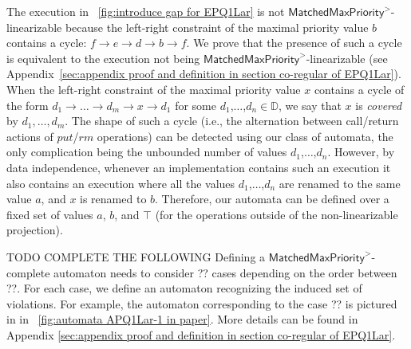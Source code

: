 The execution in \figurename~\ref{fig:introduce gap for EPQ1Lar} is not $\mathsf{MatchedMaxPriority}^>$-linearizable because the left-right constraint of the maximal priority value $b$ contains a cycle: $f \rightarrow e \rightarrow d \rightarrow b \rightarrow f$. We prove that the presence of such a cycle is equivalent to the execution not being $\mathsf{MatchedMaxPriority}^>$-linearizable (see Appendix~\ref{sec:appendix proof and definition in section co-regular of EPQ1Lar}).
When the left-right constraint of the maximal priority value $x$ contains a cycle of the form $d_1 \rightarrow \ldots \rightarrow d_m \rightarrow x \rightarrow d_1$ for some $d_1$,$\ldots$,$d_n\in \mathbb{D}$, we say that $x$ is \emph{covered} by $d_1,\ldots,d_m$. The shape of such a cycle (i.e., the alternation between call/return actions of $\textit{put}$/$\textit{rm}$ operations) can be detected using our class of automata, the only complication being the unbounded number of values $d_1$,$\ldots$,$d_n$. However, by data independence, whenever an implementation contains such an execution it also contains an execution where all the values $d_1$,$\ldots$,$d_n$ are renamed to the same value $a$, and $x$ is renamed to $b$. Therefore, our automata can be defined over a fixed set of values $a$, $b$, and $\top$ (for the operations outside of the non-linearizable projection).

TODO COMPLETE THE FOLLOWING
Defining a $\mathsf{MatchedMaxPriority}^>$-complete automaton needs to consider ?? cases depending on the order between ??. For each case, we define an automaton recognizing the induced set of violations. For example, the automaton corresponding to the case ?? is pictured in in \figurename~\ref{fig:automata APQ1Lar-1 in paper}. More details can be found in Appendix \ref{sec:appendix proof and definition in section co-regular of EPQ1Lar}.



